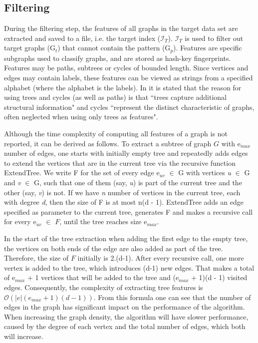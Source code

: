 \documentclass{l4proj}
\newcommand{\fancyI}{\mathcal{I}}
\begin{document}
\subsection{Filtering}
\label{subsec:ctindexF}
During the filtering step, the features of all graphs in the target data set are extracted and saved to a file, i.e. the target index ($\fancyI_{T}$). $\fancyI_{T}$ is used to filter out target graphs (G$_{t}$) that cannot contain the pattern (G$_{p}$). Features are specific subgraphs used to classify graphs, and are stored as hash-key fingerprints. Features may be paths, subtrees or cycles of bounded length. Since vertices and edges may contain labels, these features can be viewed as strings from a specified alphabet (where the alphabet is the labels). In \cite{ctindex} it is stated that the reason for using \glspl{tree} and cycles (as well as paths) is that ``trees capture additional structural information" and cycles ``represent the distinct characteristic of graphs, often neglected when using only trees as features".

Although the time complexity of computing all features of a graph is not reported, it can be derived as follows. To extract a subtree of graph $G$ with e$_{max}$ number of edges, one starts with initially empty tree and repeatedly adds edges to extend the vertices that are in the current tree via the recursive function ExtendTree. We write F for the set of every edge e$_{uv}$ $\in$ G with vertices \textit{u} $\in$ G and \textit{v} $\in$ G, such that one of them (say, \textit{u}) is part of the current tree and the other (say, \textit{v}) is not. If we have \textit{n} number of vertices in the current tree, each with degree \textit{d}, then the size of F is at most n(d - 1). ExtendTree adds an edge specified as parameter to the current tree, generates F and makes a recursive call for every e$_{uv}$ $\in$ $F$, until the tree reaches size e$_{max}$.

In the start of the \gls{tree} extraction when adding the first edge to the empty tree, the vertices on both ends of the edge are also added as part of the tree. Therefore, the size of $F$ initially is 2.(d-1). After every recursive call, one more vertex is added to the tree, which introduces (d-1) new edges. That makes a total of e$_{max}$ + 1 vertices that will be added to the tree and (e$_{max}$ + 1)(d - 1) visited edges. Consequently, the complexity of extracting tree features is $\mathcal{O}(|e|(e_{max} + 1)(d - 1))$. From this formula one can see that the number of edges in the graph has significant impact on the performance of the algorithm. When increasing the graph density, the algorithm will have slower performance, caused by the degree of each vertex and the total number of edges, which both will increase.
\end{document}
